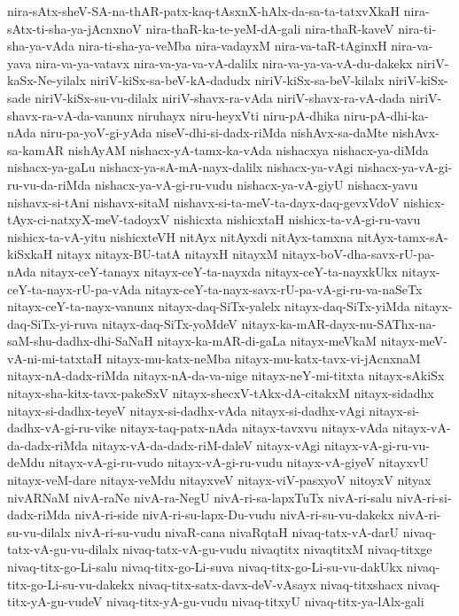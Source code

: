 {nira-sAtx-sheV-SA-na-thAR-patx-kaq-tAsxnX-hAlx-da-sa-ta-tatxvXkaH
nira-sAtx-ti-sha-ya-jAcnxnoV
nira-thaR-ka-te-yeM-dA-gali
nira-thaR-kaveV
nira-ti-sha-ya-vAda
nira-ti-sha-ya-veMba
nira-vadayxM
nira-va-taR-tAginxH
nira-va-yava
nira-va-ya-vatavx
nira-va-ya-va-vA-dalilx
nira-va-ya-va-vA-du-dakekx
niriV-kaSx-Ne-yilalx
niriV-kiSx-sa-beV-kA-dadudx
niriV-kiSx-sa-beV-kilalx
niriV-kiSx-sade
niriV-kiSx-su-vu-dilalx
niriV-shavx-ra-vAda
niriV-shavx-ra-vA-dada
niriV-shavx-ra-vA-da-vanunx
niruhayx
niru-heyxVti
niru-pA-dhika
niru-pA-dhi-ka-nAda
niru-pa-yoV-gi-yAda
niseV-dhi-si-dadx-riMda
nishAvx-sa-daMte
nishAvx-sa-kamAR
nishAyAM
nishacx-yA-tamx-ka-vAda
nishacxya
nishacx-ya-diMda
nishacx-ya-gaLu
nishacx-ya-sA-mA-nayx-dalilx
nishacx-ya-vAgi
nishacx-ya-vA-gi-ru-vu-da-riMda
nishacx-ya-vA-gi-ru-vudu
nishacx-ya-vA-giyU
nishacx-yavu
nishavx-si-tAni
nishavx-sitaM
nishavx-si-ta-meV-ta-dayx-daq-gevxVdoV
nishicx-tAyx-ci-natxyX-meV-tadoyxV
nishicxta
nishicxtaH
nishicx-ta-vA-gi-ru-vavu
nishicx-ta-vA-yitu
nishicxteVH
nitAyx
nitAyxdi
nitAyx-tamxna
nitAyx-tamx-sA-kiSxkaH
nitayx
nitayx-BU-tatA
nitayxH
nitayxM
nitayx-boV-dha-savx-rU-pa-nAda
nitayx-ceY-tanayx
nitayx-ceY-ta-nayxda
nitayx-ceY-ta-nayxkUkx
nitayx-ceY-ta-nayx-rU-pa-vAda
nitayx-ceY-ta-nayx-savx-rU-pa-vA-gi-ru-va-naSeTx
nitayx-ceY-ta-nayx-vanunx
nitayx-daq-SiTx-yalelx
nitayx-daq-SiTx-yiMda
nitayx-daq-SiTx-yi-ruva
nitayx-daq-SiTx-yoMdeV
nitayx-ka-mAR-dayx-nu-SAThx-na-saM-shu-dadhx-dhi-SaNaH
nitayx-ka-mAR-di-gaLa
nitayx-meVkaM
nitayx-meV-vA-ni-mi-tatxtaH
nitayx-mu-katx-neMba
nitayx-mu-katx-tavx-vi-jAcnxnaM
nitayx-nA-dadx-riMda
nitayx-nA-da-va-nige
nitayx-neY-mi-titxta
nitayx-sAkiSx
nitayx-sha-kitx-tavx-pakeSxV
nitayx-shecxV-tAkx-dA-citakxM
nitayx-sidadhx
nitayx-si-dadhx-teyeV
nitayx-si-dadhx-vAda
nitayx-si-dadhx-vAgi
nitayx-si-dadhx-vA-gi-ru-vike
nitayx-taq-patx-nAda
nitayx-tavxvu
nitayx-vAda
nitayx-vA-da-dadx-riMda
nitayx-vA-da-dadx-riM-daleV
nitayx-vAgi
nitayx-vA-gi-ru-vu-deMdu
nitayx-vA-gi-ru-vudo
nitayx-vA-gi-ru-vudu
nitayx-vA-giyeV
nitayxvU
nitayx-veM-dare
nitayx-veMdu
nitayxveV
nitayx-viV-pasxyoV
nitoyxV
nityax
nivARNaM
nivA-raNe
nivA-ra-NegU
nivA-ri-sa-lapxTuTx
nivA-ri-salu
nivA-ri-si-dadx-riMda
nivA-ri-side
nivA-ri-su-lapx-Du-vudu
nivA-ri-su-vu-dakekx
nivA-ri-su-vu-dilalx
nivA-ri-su-vudu
nivaR-cana
nivaRqtaH
nivaq-tatx-vA-darU
nivaq-tatx-vA-gu-vu-dilalx
nivaq-tatx-vA-gu-vudu
nivaqtitx
nivaqtitxM
nivaq-titxge
nivaq-titx-go-Li-salu
nivaq-titx-go-Li-suva
nivaq-titx-go-Li-su-vu-dakUkx
nivaq-titx-go-Li-su-vu-dakekx
nivaq-titx-satx-davx-deV-vAsayx
nivaq-titxshacx
nivaq-titx-yA-gu-vudeV
nivaq-titx-yA-gu-vudu
nivaq-titxyU
nivaq-titx-ya-lAlx-gali
}

